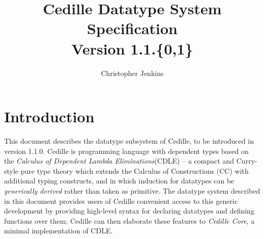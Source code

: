 \documentclass{article}
\begin{document}
\title{Cedille Datatype System Specification \\ \large Version 1.1.\{0,1\}}

\author{Christopher Jenkins}

\maketitle
\tableofcontents
\newpage
\section{Introduction}
\label{sec:intro}
This document describes the datatype subsystem of Cedille, to be introduced in
version 1.1.0. Cedille is programming language with dependent types based on the
\textit{Calculus of Dependent Lambda Eliminations}(CDLE)\cite{St17_CDLE} -- a
compact and Curry-style pure type theory which extends the Calculus of
Constructions (CC)\cite{CH86_CC} with additional typing constructs, and in which
induction for datatypes can be \textit{generically
  derived}\cite{FBS18_Efficient-Mendler} rather than taken as primitive. The
datatype system described in this document provides users of Cedille convenient
access to this generic development by providing high-level syntax for declaring
datatypes and defining functions over them; Cedille can then elaborate these
features to \textit{Cedille Core}\cite{St18_Cedille-Core}, a minimal
implementation of CDLE.
\end{document}
